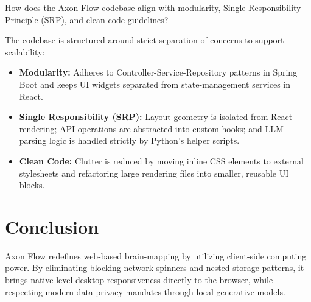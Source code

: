 \documentclass[12pt, a4paper]{article}
\begin{document}
\begin{questionbox}
How does the Axon Flow codebase align with modularity, Single Responsibility Principle (SRP), and clean code guidelines?
\end{questionbox}

\begin{answerbox}[Answer]
The codebase is structured around strict separation of concerns to support scalability:
\begin{itemize}
  \item \textbf{Modularity:} Adheres to Controller-Service-Repository patterns in Spring Boot and keeps UI widgets separated from state-management services in React.
  \item \textbf{Single Responsibility (SRP):} Layout geometry is isolated from React rendering; API operations are abstracted into custom hooks; and LLM parsing logic is handled strictly by Python's helper scripts.
  \item \textbf{Clean Code:} Clutter is reduced by moving inline CSS elements to external stylesheets and refactoring large rendering files into smaller, reusable UI blocks.
\end{itemize}
\end{answerbox}

\newpage
\section{Conclusion}

Axon Flow redefines web-based brain-mapping by utilizing client-side computing power. By eliminating blocking network spinners and nested storage patterns, it brings native-level desktop responsiveness directly to the browser, while respecting modern data privacy mandates through local generative models.
\end{document}
